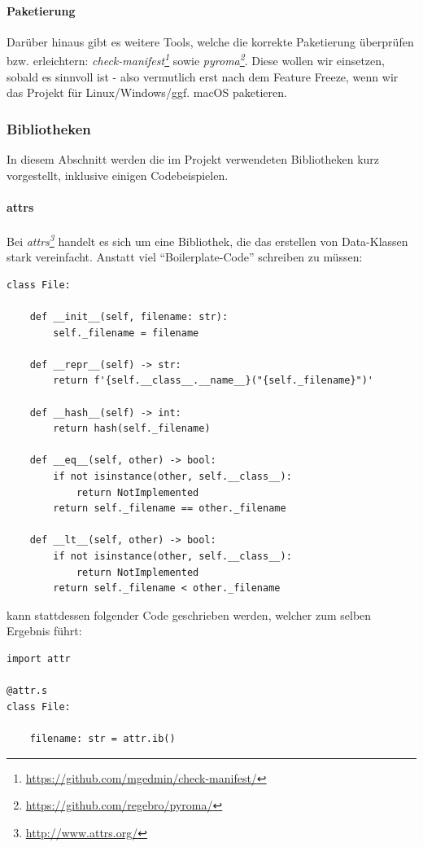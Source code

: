 \documentclass[a4paper]{article}
\newcommand{\tool}[2]{\emph{#1\footnote{\url{#2}}}}
\begin{document}
\paragraph{Paketierung} Darüber hinaus gibt es weitere Tools, welche die
korrekte Paketierung überprüfen bzw. erleichtern:
\tool{check-manifest}{https://github.com/mgedmin/check-manifest/}
sowie \tool{pyroma}{https://github.com/regebro/pyroma/}. Diese
wollen wir einsetzen, sobald es sinnvoll ist - also vermutlich erst nach dem Feature Freeze, wenn wir das Projekt für Linux/Windows/ggf. macOS paketieren.

\subsubsection{Bibliotheken}

In diesem Abschnitt werden die im Projekt verwendeten Bibliotheken kurz
vorgestellt, inklusive einigen Codebeispielen.

\paragraph{attrs} Bei \tool{attrs}{http://www.attrs.org/} handelt es sich um eine Bibliothek, die das
erstellen von Data-Klassen stark vereinfacht. Anstatt viel ``Boilerplate-Code''
schreiben zu müssen:

\begin{verbatim}
class File:

    def __init__(self, filename: str):
        self._filename = filename

    def __repr__(self) -> str:
        return f'{self.__class__.__name__}("{self._filename}")'

    def __hash__(self) -> int:
        return hash(self._filename)

    def __eq__(self, other) -> bool:
        if not isinstance(other, self.__class__):
            return NotImplemented
        return self._filename == other._filename

    def __lt__(self, other) -> bool:
        if not isinstance(other, self.__class__):
            return NotImplemented
        return self._filename < other._filename
\end{verbatim}

kann stattdessen folgender Code geschrieben werden, welcher zum selben Ergebnis führt:

\begin{verbatim}
import attr

@attr.s
class File:

    filename: str = attr.ib()
\end{verbatim}
\end{document}

